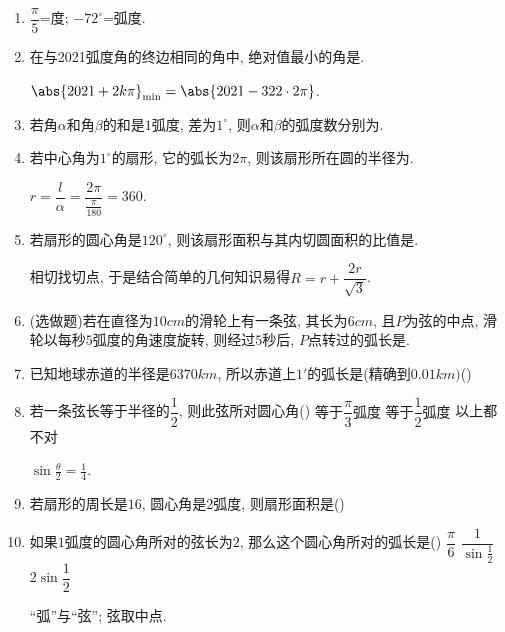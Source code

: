 \begin{enumerate}
\item $\dfrac{\pi}{5}$=度; $-72^{\circ}$=弧度. 

\item 在与2021弧度角的终边相同的角中, 绝对值最小的角是. 
\begin{jieda}
$\abs{2021+2k\pi}_{\min}=\abs{2021-322\cdot2\pi}$. 
\end{jieda}


\item 若角$\alpha$和角$\beta$的和是$1$弧度, 差为$1^{\circ}$, 则$\alpha$和$\beta$的弧度数分别为. 

\item 若中心角为$1^{\circ}$的扇形, 它的弧长为$2\pi$, 则该扇形所在圆的半径为. 
\begin{jieda}
$r=\dfrac{l}{\alpha}=\dfrac{2\pi}{\frac{\pi}{180}}=360$. 
\end{jieda}


\item 若扇形的圆心角是$120^{\circ}$, 则该扇形面积与其内切圆面积的比值是. 
\begin{jieda}
相切找切点, 于是结合简单的几何知识易得$R=r+\dfrac{2r}{\sqrt{3}}$. 
\end{jieda}


\item (选做题)若在直径为$10\si{cm}$的滑轮上有一条弦, 其长为$6\si{cm}$, 且$P$为弦的中点, 滑轮以每秒$5$弧度的角速度旋转, 则经过$5$秒后, $P$点转过的弧长是. 


\item 已知地球赤道的半径是$6370\si{km}$, 所以赤道上${1}'$的弧长是(精确到$0.01\si{km})$\dotfill()


\item 若一条弦长等于半径的$\dfrac{1}{2}$, 则此弦所对圆心角\dotfill()
{等于$\dfrac{\pi}{3}$弧度}
{等于$\dfrac{1}{2}$弧度}
{以上都不对}
\begin{jieda}
$\sin\frac{\theta}{2}=\frac{1}{4}$. 
\end{jieda}


\item 若扇形的周长是$16$, 圆心角是$2$弧度, 则扇形面积是\dotfill()


\item 如果$1$弧度的圆心角所对的弦长为$2$, 那么这个圆心角所对的弧长是\dotfill()
{$\dfrac{\pi}{6}$}
{$\dfrac{1}{\sin\frac{1}{2}}$}
{$2\sin\dfrac{1}{2}$}
\begin{jieda}
``弧''与``弦''; 弦取中点. 
\end{jieda}



\end{enumerate}

